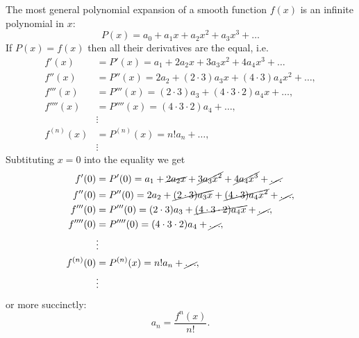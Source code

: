 The most general polynomial expansion of a smooth function $f(x)$ is an infinite polynomial in $x$:
\begin{equation}
	P(x) = a_{0} + a_{1}x + a_{2}x^{2} + a_{3}x^{3} + \dots
	\label{eq:general_polynomial_in_x}
\end{equation}
If $P(x)=f(x)$ then all their derivatives are the equal, i.e.
\begin{equation}
	\begin{aligned}
		f'(x)      & = P'(x) = a_{1} + 2a_{2}x + 3a_{3}x^{2} + 4a_{4}x^{3} + \dots      \\
		f''(x)     & = P''(x) = 2a_{2} + (2\cdot3)a_{3}x + (4\cdot3)a_{4}x^{2} + \dots, \\
		f'''(x)    & = P'''(x) = (2\cdot3)a_{3} + (4\cdot3\cdot2)a_{4}x + \dots,        \\
		f''''(x)   & = P''''(x) = (4\cdot3\cdot2)a_{4} + \dots,                         \\
		           & \vdots                                                             \\
		f^{(n)}(x) & = P^{(n)}(x) = n!a_{n} + \dots,                                    \\
		           & \vdots
	\end{aligned}
	\label{eq:polynomial_function_derivative_equality}
\end{equation}
Subtituting $x=0$ into the equality we get
\begin{equation}
	\begin{aligned}
		f'(0)      & = P'(0) = a_{1} + \cancel{2a_{2}x} + \cancel{3a_{3}x^{2}} + \cancel{4a_{4}x^{3}} + \cancel{\dots}\\
		f''(0)     & = P''(0) = 2a_{2} + \cancel{(2\cdot3)a_{3}x} + \cancel{(4\cdot3)a_{4}x^{2}} + \cancel{\dots},\\
		f'''(0)    & = P'''(0) = (2\cdot3)a_{3} + \cancel{(4\cdot3\cdot2)a_{4}x} + \cancel{\dots},\\
		f''''(0)   & = P''''(0) = (4\cdot3\cdot2)a_{4} + \cancel{\dots},\\
		           & \vdots\\
		f^{(n)}(0) & = P^{(n)}(x) = n!a_{n} + \cancel{\dots},\\
		           & \vdots
	\end{aligned}
	\label{eq:polynomial_function_derivatives_at_0}
\end{equation}
or more succinctly:
\begin{equation}
	a_{n} = \frac{f^{n}(x)}{n!}.
	\label{eq:taylor_coefficients}
\end{equation}

